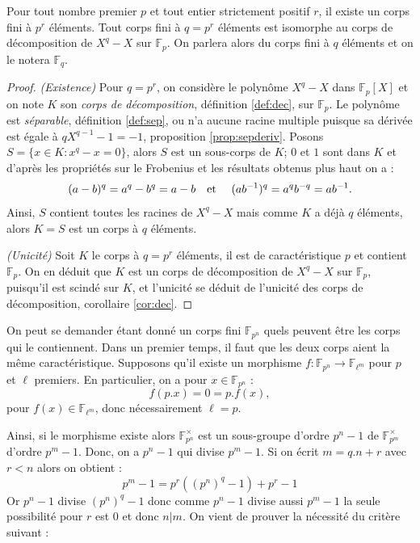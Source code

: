 \documentclass[a4paper]{article} %
\numberwithin{section}{part}
\numberwithin{equation}{section}
\newcommand\GF[1]{\mathbb{F}_{#1}}
\newcommand\etmath{\textup{\quad et \quad}}
\begin{document}
\begin{thm}
\label{th:isomGF}
Pour tout nombre premier $p$ et tout entier strictement positif $r$, il existe 
un corps fini à $p^r$ éléments. Tout corps fini à $q = p^r$ éléments est 
isomorphe au corps de décomposition de $X^q - X$ sur $\GF{p}$. On parlera 
alors du corps fini à $q$ éléments et on le notera $\GF{q}$.
\end{thm}
\begin{proof}
\textit{(Existence)} Pour $q = p^r$, on considère le polynôme $X^q - X$ dans 
$\GF{p}[X]$ et on note $K$ son \emph{corps de décomposition}, définition 
\ref{def:dec}, sur $\GF{p}$. Le polynôme est \emph{séparable}, définition 
\ref{def:sep}, ou n'a aucune racine multiple puisque sa dérivée est égale à 
$qX^{q-1} - 1 = -1$, proposition \ref{prop:sepderiv}. Posons $S=\lbrace x\in K 
: x^q - x = 0\rbrace$, alors $S$ est un sous-corps de $K$; $0$ et $1$ sont 
dans $K$ et d'après les propriétés sur le Frobenius et les résultats obtenus 
plus haut on a :
\begin{equation}
(a - b)^q = a^q - b^q = a - b \etmath(ab^{-1})^q = a^qb^{-q} = ab^{-1}.
\end{equation}
Ainsi, $S$ contient toutes les racines de $X^q - X$ mais comme $K$ a déjà $q$
éléments, alors $K = S$ est un corps à $q$ éléments.\par
\textit{(Unicité)} Soit $K$ le corps à $q = p^r$ éléments, il est de 
caractéristique $p$ et contient $\GF{p}$. On en déduit que $K$ est un corps de 
décomposition de $X^q - X$ sur $\GF{p}$, puisqu'il est scindé sur $K$, et 
l'unicité se déduit de l'unicité des corps de décomposition, corollaire 
\ref{cor:dec}.
\end{proof}

On peut se demander étant donné un corps fini $\GF{p^n}$ quels peuvent être les 
corps qui le contiennent. Dans un premier temps, il faut que les deux corps 
aient la même caractéristique. Supposons qu'il existe un morphisme $f : \GF{p^n}
\to \GF{\ell^m}$ pour $p$ et $\ell$ premiers. En particulier, on a pour 
$x\in\GF{p^n}$ :
\begin{equation}
f(p.x) = 0 = p.f(x),
\end{equation}
pour $f(x)\in\GF{\ell^m}$, donc nécessairement $\ell = p$.\par
Ainsi, si le morphisme existe alors $\GF{p^n}^{\times}$ est un sous-groupe
d'ordre $p^n - 1$ de $\GF{p^m}^{\times}$ d'ordre $p^m - 1$. Donc, on a $p^n - 1$
qui divise $p^m - 1$. Si on écrit $m = q.n + r$ avec $r < n$ alors on obtient :
\[p^m - 1 = p^r((p^n)^q - 1) + p^r - 1\]
Or $p^n - 1$ divise $(p^n)^q - 1$ donc comme $p^n - 1$ divise aussi $p^m - 1$ la
seule possibilité pour $r$ est $0$ et donc $n|m$. On vient de prouver la
nécessité du critère suivant :
\end{document}
